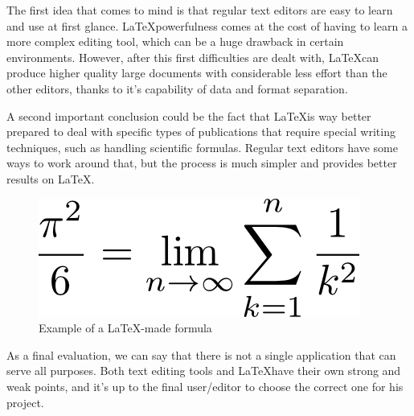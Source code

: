 The first idea that comes to mind is that regular text editors are easy to learn and use at first glance. \LaTeX powerfulness comes at the cost of having to learn a more complex editing tool, which can be a huge drawback in certain environments. However, after this first difficulties are dealt with, \LaTeX can produce higher quality large documents with considerable less effort than the other editors, thanks to it's capability of data and format separation.

A second important conclusion could be the fact that \LaTeX is way better prepared to deal with specific types of publications that require special writing techniques, such as handling scientific formulas. Regular text editors have some ways to work around that, but the process is much simpler and provides better results on \LaTeX.

\begin{figure}[H]
  \centering
  \includegraphics[scale=0.5]{Chapters/LaTeXFormulaEffect.png}
  \caption{ Example of a \LaTeX-made formula\protect\footnotemark}
  \label{fig:LaTeX-formula-example}
\end{figure}


As a final evaluation, we can say that there is not a single application that can serve all purposes. Both text editing tools and \LaTeX have their own strong and weak points, and it's up to the final user/editor to choose the correct one for his project.

